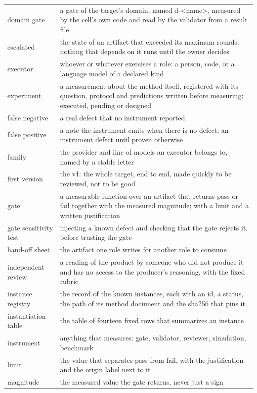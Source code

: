 \documentclass[
  american,
  10pt,
]{report}
\renewcommand{\texttt}[1]{{\ttfamily\hyphenchar\font=-1 #1}}
\begin{document}
{\begin{longtable}[]{@{}
  >{\raggedright\arraybackslash}p{}
  >{\raggedright\arraybackslash}p{}@{}}
domain gate & a gate of the target's domain, named
\texttt{d-\allowbreak{}<name>}, measured by the cell's own code and read
by the validator from a result file \\
escalated & the state of an artifact that exceeded its maximum rounds:
nothing that depends on it runs until the owner decides \\
executor & whoever or whatever exercises a role: a person, code, or a
language model of a declared kind \\
experiment & a measurement about the method itself, registered with its
question, protocol and predictions written before measuring;
\texttt{executed}, \texttt{pending} or \texttt{designed} \\
false negative & a real defect that no instrument reported \\
false positive & a note the instrument emits when there is no defect; an
instrument defect until proven otherwise \\
family & the provider and line of models an executor belongs to, named
by a stable letter \\
first version & the v1: the whole target, end to end, made quickly to be
reviewed, not to be good \\
gate & a measurable function over an artifact that returns pass or fail
together with the measured magnitude; with a limit and a written
justification \\
gate sensitivity test & injecting a known defect and checking that the
gate rejects it, before trusting the gate \\
hand-off sheet & the artifact one role writes for another role to
consume \\
independent review & a reading of the product by someone who did not
produce it and has no access to the producer's reasoning, with the fixed
rubric \\
instance registry & the record of the known instances, each with an id,
a status, the path of its method document and the sha256 that pins it \\
instantiation table & the table of fourteen fixed rows that summarizes
an instance \\
instrument & anything that measures: gate, validator, reviewer,
simulation, benchmark \\
limit & the value that separates pass from fail, with the justification
and the origin label next to it \\
magnitude & the measured value the gate returns, never just a sign \\

\end{longtable}}
\end{document}
